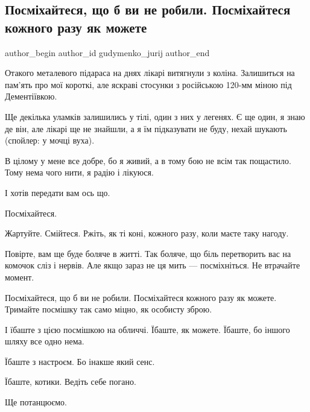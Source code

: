  
 
 
 
 
 
\subsection{Посміхайтеся, що б ви не робили. Посміхайтеся кожного разу як можете}
\label{sec:10_07_2022.fb.gudymenko_jurij.1.posmihajtes}
 
\ifcmt
 author_begin
   author_id gudymenko_jurij
 author_end
\fi

Отакого металевого підараса на днях лікарі витягнули з коліна. Залишиться на
пам'ять про мої короткі, але яскраві стосунки з російською 120-мм міною під
Дементіївкою.

Ще декілька уламків залишились у тілі, один з них у легенях. Є ще один, я знаю
де він, але лікарі ще не знайшли, а я їм підказувати не буду, нехай шукають
(спойлер: у мочці вуха). 

В цілому у мене все добре, бо я живий, а в тому бою не всім так пощастило. Тому
нема чого нити, я радію і лікуюся. 

І хотів передати вам ось що.

Посміхайтеся. 

Жартуйте. Смійтеся. Ржіть, як ті коні, кожного разу, коли маєте таку нагоду.

Повірте, вам ще буде боляче в житті. Так боляче, що біль перетворить вас на
комочок сліз і нервів. Але якщо зараз не ця мить — посміхніться. Не втрачайте
момент. 

Посміхайтеся, що б ви не робили. Посміхайтеся кожного разу як можете. Тримайте
посмішку так само міцно, як особисту зброю.

І їбаште з цією посмішкою на обличчі. Їбаште, як можете. Їбаште, бо іншого
шляху все одно нема.

Їбаште з настроєм. Бо інакше який сенс.

Їбаште, котики. Ведіть себе погано.

Ще потанцюємо.
